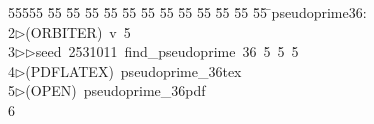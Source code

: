 %
%
\begin{tabbing}
55555 \= 55 \= 55 \= 55 \= 55 \= 55 \= 55 \= 55 \= 55 \= 55 \= 55 \= 55 \= 55 \= \>pseudoprime36:\\[0pt]
2\>$\triangleright$\>(ORBITER)\ v\ 5\ \\[0pt]
3\>$\triangleright$\>$\triangleright$\>seed\ 2531011\ find\_pseudoprime\ 36\ 5\ 5\ 5\ \\[0pt]
4\>$\triangleright$\>(PDFLATEX)\ pseudoprime\_36tex\\[0pt]
5\>$\triangleright$\>(OPEN)\ pseudoprime\_36pdf\\[0pt]
6\>\end{tabbing}
